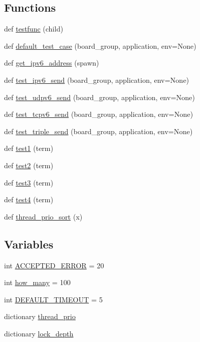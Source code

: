 \subsection*{Functions}
\begin{DoxyCompactItemize}
\item 
def \hyperlink{namespace01-run_aff983ffd4ab0e6bf8e7e58970e4a10bb}{testfunc} (child)
\item 
def \hyperlink{namespace01-run_ad8f8d1b62f5d6ce614a7956dc3a6ca40}{default\+\_\+test\+\_\+case} (board\+\_\+group, application, env=None)
\item 
def \hyperlink{namespace01-run_afbee4f06ec853d191a2876c017efcdcc}{get\+\_\+ipv6\+\_\+address} (spawn)
\item 
def \hyperlink{namespace01-run_a798e8a5d7092f930c4ca7ce48d658113}{test\+\_\+ipv6\+\_\+send} (board\+\_\+group, application, env=None)
\item 
def \hyperlink{namespace01-run_a498ff87ebeb18334cf6110214d60bb53}{test\+\_\+udpv6\+\_\+send} (board\+\_\+group, application, env=None)
\item 
def \hyperlink{namespace01-run_aa33fb8b27f2a329f22f50abe430854eb}{test\+\_\+tcpv6\+\_\+send} (board\+\_\+group, application, env=None)
\item 
def \hyperlink{namespace01-run_ae96b1a02460277a9a00628064721b4ae}{test\+\_\+triple\+\_\+send} (board\+\_\+group, application, env=None)
\item 
def \hyperlink{namespace01-run_a06344429edc2313358f59b0e501f1ae5}{test1} (term)
\item 
def \hyperlink{namespace01-run_ada98d444a3fe857d31d3d37e9f356d8e}{test2} (term)
\item 
def \hyperlink{namespace01-run_a257feca6e1f04f60b7588f885a4a4467}{test3} (term)
\item 
def \hyperlink{namespace01-run_accc621a2eeba8d4a50746f6737268706}{test4} (term)
\item 
def \hyperlink{namespace01-run_a9a3d0f55b0b22faa1021654ea4bd5f66}{thread\+\_\+prio\+\_\+sort} (x)
\end{DoxyCompactItemize}
\subsection*{Variables}
\begin{DoxyCompactItemize}
\item 
int \hyperlink{namespace01-run_a7c32ad0e8ff69ef035a02a3089c5992f}{A\+C\+C\+E\+P\+T\+E\+D\+\_\+\+E\+R\+R\+OR} = 20
\item 
int \hyperlink{namespace01-run_a8435ebde0e106380ca0c31a248ff48ae}{how\+\_\+many} = 100
\item 
int \hyperlink{namespace01-run_aef2372a86df3a2d4d21068f27005d720}{D\+E\+F\+A\+U\+L\+T\+\_\+\+T\+I\+M\+E\+O\+UT} = 5
\item 
dictionary \hyperlink{namespace01-run_ad18970d15e0c79d88628872c2240e455}{thread\+\_\+prio}
\item 
dictionary \hyperlink{namespace01-run_a3e90d7ea68b49e97ae68ba6b5faa5132}{lock\+\_\+depth}
\end{DoxyCompactItemize}



